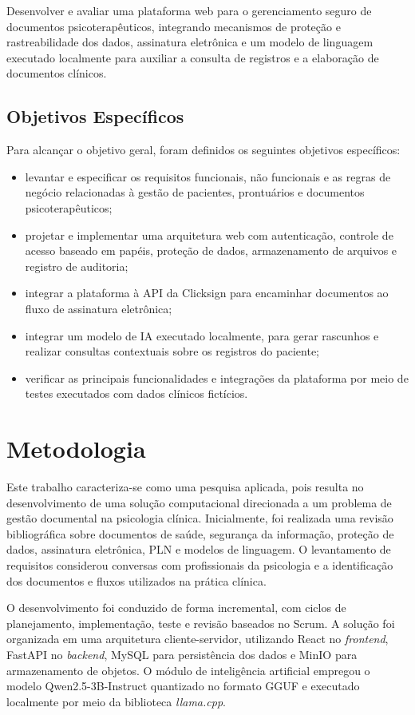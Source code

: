 Desenvolver e avaliar uma plataforma web para o gerenciamento seguro de documentos psicoterapêuticos, integrando mecanismos de proteção e rastreabilidade dos dados, assinatura eletrônica e um modelo de linguagem executado localmente para auxiliar a consulta de registros e a elaboração de documentos clínicos.

\subsection{Objetivos Específicos}

Para alcançar o objetivo geral, foram definidos os seguintes objetivos específicos:

\begin{itemize}
    \item levantar e especificar os requisitos funcionais, não funcionais e as regras de negócio relacionadas à gestão de pacientes, prontuários e documentos psicoterapêuticos;
    \item projetar e implementar uma arquitetura web com autenticação, controle de acesso baseado em papéis, proteção de dados, armazenamento de arquivos e registro de auditoria;
    \item integrar a plataforma à API da Clicksign para encaminhar documentos ao fluxo de assinatura eletrônica;
    \item integrar um modelo de IA executado localmente, para gerar rascunhos e realizar consultas contextuais sobre os registros do paciente;
    \item verificar as principais funcionalidades e integrações da plataforma por meio de testes executados com dados clínicos fictícios.
\end{itemize}

\section{Metodologia}

Este trabalho caracteriza-se como uma pesquisa aplicada, pois resulta no desenvolvimento de uma solução computacional direcionada a um problema de gestão documental na psicologia clínica. Inicialmente, foi realizada uma revisão bibliográfica sobre documentos de saúde, segurança da informação, proteção de dados, assinatura eletrônica, PLN e modelos de linguagem. O levantamento de requisitos considerou conversas com profissionais da psicologia e a identificação dos documentos e fluxos utilizados na prática clínica.

O desenvolvimento foi conduzido de forma incremental, com ciclos de planejamento, implementação, teste e revisão baseados no Scrum. A solução foi organizada em uma arquitetura cliente-servidor, utilizando React no \textit{frontend}, FastAPI no \textit{backend}, MySQL para persistência dos dados e MinIO para armazenamento de objetos. O módulo de inteligência artificial empregou o modelo Qwen2.5-3B-Instruct quantizado no formato GGUF e executado localmente por meio da biblioteca \textit{llama.cpp}.

